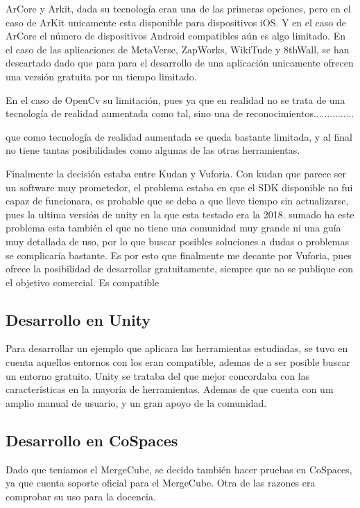ArCore y Arkit, dada su tecnología eran una de las primeras opciones, pero en el caso de ArKit unicamente esta disponible para dispositivos iOS. Y en el caso de ArCore el número de dispositivos Android compatibles aún es algo limitado.
En el caso de las aplicaciones de MetaVerse, ZapWorks, WikiTude y 8thWall, se han descartado dado que para para el desarrollo de una aplicación unicamente ofrecen una versión gratuita por un tiempo limitado.

En el caso de OpenCv su limitación, pues ya que en realidad no se trata de una tecnología de realidad aumentada como tal, sino una de reconocimientos...............

 que como tecnología de realidad aumentada se queda bastante limitada, y al final no tiene tantas posibilidades como algunas de las otras herramientas.

Finalmente la decisión estaba entre Kudan y Vuforia. Con kudan que parece ser un software muy prometedor, el problema estaba en que el SDK disponible no fui capaz de funcionara, es probable que se deba a que lleve tiempo sin actualizarse, pues la ultima versión de unity en la que esta testado era la 2018. sumado ha este problema esta también el que no tiene una comunidad muy grande ni una guía muy detallada de uso, por lo que buscar posibles soluciones a dudas o problemas se complicaría bastante.
Es por esto que finalmente me decante por Vuforia, pues  ofrece la posibilidad de desarrollar gratuitamente, siempre que no se publique con el objetivo comercial. Es compatible 


\subsection{Desarrollo en Unity}
Para desarrollar un ejemplo que aplicara las herramientas estudiadas, se tuvo en cuenta aquellos entornos con los eran compatible, ademas de a ser posible buscar un entorno gratuito. Unity se trataba del que mejor concordaba con las características en la mayoría de herramientas. Ademas de que cuenta con um amplio manual de usuario, y un gran apoyo de la comunidad.

\subsection{Desarrollo en CoSpaces}
Dado que teniamos el MergeCube, se decido también hacer pruebas en CoSpaces, ya que cuenta soporte oficial para el MergeCube. Otra de las razones era comprobar su uso para la docencia.

